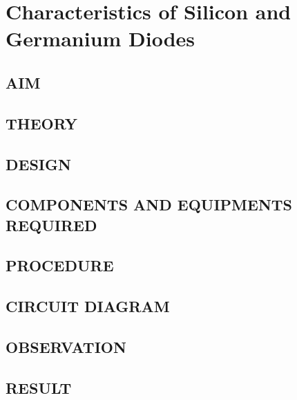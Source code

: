 \chapter[Characteristics of Diodes]{Characteristics of Silicon and Germanium Diodes}

\section*[AIM]{AIM}

\section*[THEORY]{THEORY}
\section*[DESIGN]{DESIGN}
\section*[COMPONENTS AND EQUIPMENTS REQUIRED]{COMPONENTS AND EQUIPMENTS REQUIRED}
\section*[PROCEDURE]{PROCEDURE}
\section*[CIRCUIT DIAGRAM]{CIRCUIT DIAGRAM}
\section*[OBSERVATION]{OBSERVATION}
\section*[RESULT]{RESULT}



